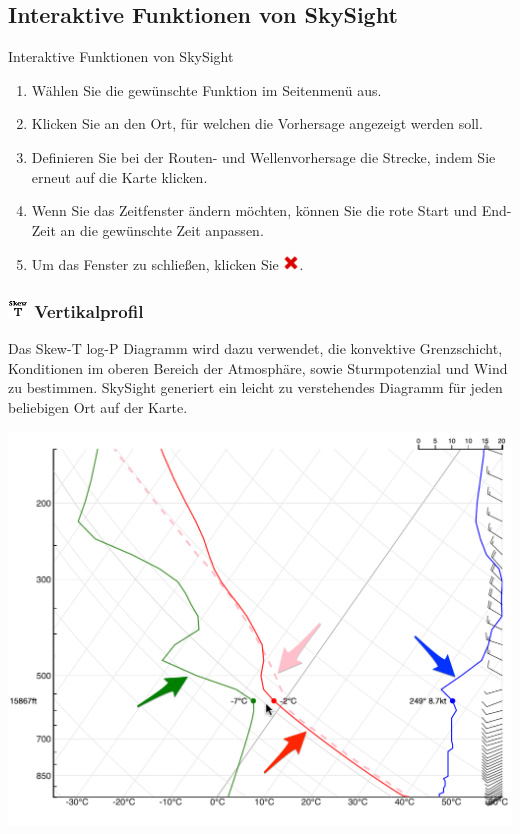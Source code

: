 \documentclass[9pt,a4paper,twocolumn]{article}
\begin{document}
\subsection*{Interaktive Funktionen von SkySight}
Interaktive Funktionen von SkySight
\begin{enumerate}
  \item Wählen Sie die gewünschte Funktion im Seitenmenü aus.
  \item Klicken Sie an den Ort, für welchen die Vorhersage angezeigt werden soll.
  \item Definieren Sie bei der Routen- und Wellenvorhersage die Strecke, indem Sie erneut auf die Karte klicken.
  \item Wenn Sie das Zeitfenster ändern möchten, können Sie die rote Start und End-Zeit an die gewünschte Zeit anpassen.
  \item Um das Fenster zu schließen, klicken Sie \includegraphics[height=12pt]{images/icons/exit.png}.
\end{enumerate}
\subsubsection*{\includegraphics[height=15pt]{images/icons/skew-t.png} Vertikalprofil}
Das Skew-T log-P Diagramm wird dazu verwendet, die konvektive Grenzschicht, Konditionen im oberen Bereich der Atmosphäre, sowie Sturmpotenzial und Wind zu bestimmen. SkySight generiert ein leicht zu verstehendes Diagramm für jeden beliebigen Ort auf der Karte.

\includegraphics[width=\linewidth]{images/skew-t.png}
\end{document}
